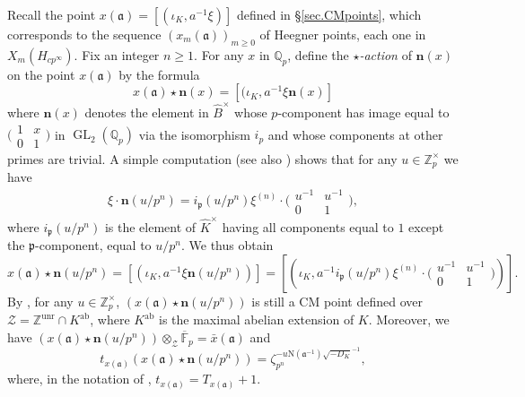 \documentclass[a4paper,11pt]{amsart}
\numberwithin{equation}{section}
\theoremstyle{plain}
\theoremstyle{definition}
\theoremstyle{remark}
\newcommand{\Q}{\mathbb Q}
\newcommand{\Z}{\mathbb Z}
\newcommand{\F}{\mathbb F}
\newcommand{\p}{\mathfrak{p}}
\DeclareMathOperator{\GL}{GL}
\newcommand{\unr}{\mathrm{unr}}
\newcommand{\smallmat}[4]{\bigl(\begin{smallmatrix}#1&#2\\#3&#4\end{smallmatrix}\bigr)}
\begin{document}
Recall the point $x(\mathfrak{a})=[(\iota_K,a^{-1}\xi)]$ defined in \S\ref{sec.CMpoints}, which corresponds to the sequence 
$(x_m(\mathfrak{a}))_{m\geq 0}$ of Heegner points, each one in 
${X}_m(H_{cp^\infty})$. 
Fix an integer $n\geq 1$. For any $x$ in $\Q_p$, define the \emph{$\star$-action} of $\mathbf{n}(x)$ on the point 
$x(\mathfrak{a})$ by the formula
\[x(\mathfrak{a})\star\mathbf{n}(x)=[(\iota_K,a^{-1}\xi\mathbf{n}(x)]\]
where $\mathbf{n}(x)$
denotes the element in $\widehat{B}^\times$ whose $p$-component has image equal to $\smallmat{1}{x}{0}{1}$ in $\GL_2(\Q_p)$ via the isomorphism $i_p$
and whose components at other primes are trivial. 
A simple computation (see also \cite[page 587]{CH}) shows that for any $u\in\Z_p^\times$ we have 
\[\xi\cdot\mathbf{n}(u/p^n)=
i_\mathfrak{p}(u/p^n)\xi^{(n)}\cdot\smallmat{u^{-1}}{u^{-1}}01,
\] where $i_\mathfrak{p}(u/p^n)$ is the element of $\widehat{K}^\times$ having all components equal to $1$ 
except the $\p$-component, equal to $u/p^n$.
We thus obtain 
\begin{equation}\label{CHeq}
x(\mathfrak{a})\star \mathbf{n}(u/p^n)=[(\iota_K,a^{-1}\xi\mathbf{n}(u/p^n))]=
\left[\left(\iota_K,a^{-1}i_\mathfrak{p}(u/p^n)\xi^{(n)}\cdot\smallmat{u^{-1}}{u^{-1}}01
\right)\right].\end{equation}
By \cite[Proposition 4.1]{BCK}, for any $u\in\Z_p^\times$, $(x(\mathfrak{a})\star\mathbf{n}(u/p^n))$ is still a CM point defined over $\mathcal{Z}=\Z^{\unr}\cap K^{\mathrm{ab}}$, where $K^\mathrm{ab}$ is the maximal abelian extension of $K$. Moreover, we have 
$(x(\mathfrak{a})\star\mathbf{n}(u/p^n))\otimes_\mathcal{Z}\overline{\F}_p=\bar{x}(\mathfrak{a})$ and 
\[t_{x(\mathfrak{a})}(x(\mathfrak{a})\star\mathbf{n}(u/p^n))=\zeta_{p^n}^{-u\mathrm{N}(\mathfrak{a}^{-1})\sqrt{-D_K}^{-1}},\] where, in the notation of \cite{BCK}, $t_{x(\mathfrak{a})}=T_{x(\mathfrak{a})}+1$.
 
\end{document}
